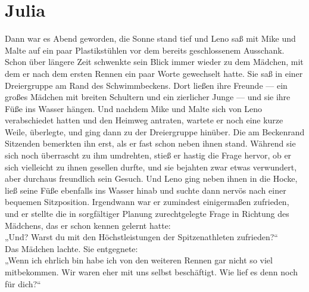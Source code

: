\documentclass[ngerman,smalldemyvopaper,11pt,oneside,onecolumn,openright,extrafontsizes]{memoir}
\begin{document}
\chapter{Julia}
Dann war es Abend geworden, die Sonne stand tief und Leno saß mit Mike und Malte auf ein paar Plastikstühlen vor dem bereits geschlossenem Ausschank. Schon über längere Zeit schwenkte sein Blick immer wieder zu dem Mädchen, mit dem er nach dem ersten Rennen ein paar Worte gewechselt hatte. Sie saß in einer Dreiergruppe am Rand des Schwimmbeckens. Dort ließen ihre Freunde — ein großes Mädchen mit breiten Schultern und ein zierlicher Junge — und sie ihre Füße ins Wasser hängen. Und nachdem Mike und Malte sich von Leno verabschiedet hatten und den Heimweg antraten, wartete er noch eine kurze Weile, überlegte, und ging dann zu der Dreiergruppe hinüber. Die am Beckenrand Sitzenden bemerkten ihn erst, als er fast schon neben ihnen stand. Während sie sich noch überrascht zu ihm umdrehten, stieß er hastig die Frage hervor, ob er sich vielleicht zu ihnen gesellen durfte, und sie bejahten zwar etwas verwundert, aber durchaus freundlich sein Gesuch. Und Leno ging neben ihnen in die Hocke, ließ seine Füße ebenfalls ins Wasser hinab und suchte dann nervös nach einer bequemen Sitzposition. Irgendwann war er zumindest einigermaßen zufrieden, und er stellte die in sorgfältiger Planung zurechtgelegte Frage in Richtung des Mädchens, das er schon kennen gelernt hatte:\\
„Und? Warst du mit den Höchstleistungen der Spitzenathleten zufrieden?“\\
Das Mädchen lachte. Sie entgegnete:\\
„Wenn ich ehrlich bin habe ich von den weiteren Rennen gar nicht so viel mitbekommen. Wir waren eher mit uns selbst beschäftigt. Wie lief es denn noch für dich?“\\
\end{document}
